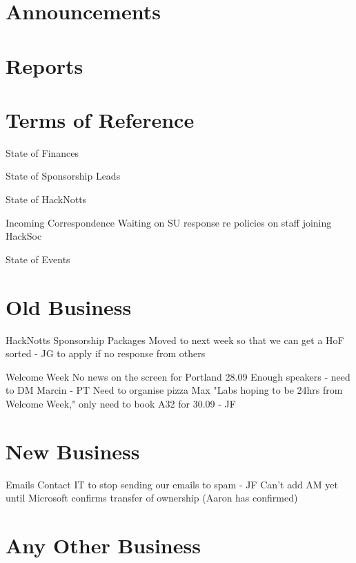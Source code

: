 \documentclass[11pt,hacksoc]{meetingmins}
\begin{document}
\maketitle

\section{Announcements}
\begin{items}
\item
\end{items}

\section{Reports}


\section{Terms of Reference}
\begin{items}
\item {State of Finances} 
\item {State of Sponsorship Leads}
\item {State of HackNotts}
\item {Incoming Correspondence}
  \subitem Waiting on SU response re policies on staff joining HackSoc
\item {State of Events}
\end{items}

\section{Old Business}
\begin{items}
\item {HackNotts}
   Sponsorship Packages
    \subsubitem Moved to next week so that we can get a HoF sorted - JG to apply if no response from others
\item {Welcome Week}
  \subitem No news on the screen for Portland 28.09
  \subitem Enough speakers - need to DM Marcin - PT
  \subitem Need to organise pizza 
  \subitem Max "Labs hoping to be 24hrs from Welcome Week," only need to book A32 for 30.09 - JF
\end{items}

\section{New Business}
\begin{items}
\item {Emails}
  \subitem Contact IT to stop sending our emails to spam - JF
  \subitem Can't add AM yet until Microsoft confirms transfer of ownership (Aaron has confirmed)
\end{items}

\section{Any Other Business}

\vspace{1em}
\nextmeeting{}
\end{document}

